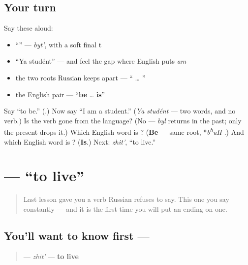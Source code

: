 \subsection*{Your turn}
Say these aloud:

\begin{itemize}
\raggedright
  \item \textquotedblleft{}\textquotedblright{} — \emph{byt'}, with a soft final t
  \item \textquotedblleft{}Ya studént\textquotedblright{} — and feel the gap where English puts \emph{am}
  \item the two roots Russian keeps apart — \textquotedblleft{} … \textquotedblright{}
  \item the English pair — \textquotedblleft{}\textbf{be} … \textbf{is}\textquotedblright{}
\end{itemize}

\begin{tcolorbox}[breakable,colback=teal!4,colframe=teal!35!black,title={Before you move on}]
Say \textquotedblleft{}to be.\textquotedblright{} (\textbf{}.) Now say \textquotedblleft{}I am a student.\textquotedblright{} (\emph{Ya studént} — two words, and no verb.) Is the verb gone from the language? (No — \emph{byl} returns in the past; only the present drops it.) Which English word is \emph{}? (\textbf{Be} — same root, *\emph{b\textsuperscript{h}uH-}.) And which English word is \emph{}? (\textbf{Is}.) Next: \emph{zhit'}, \textquotedblleft{}to live.\textquotedblright{}
\end{tcolorbox}
\section[\texorpdfstring{\ru{жить} (zhit')}{жить (zhit')}]{ — \textquotedblleft{}to live\textquotedblright{}}

\label{lesson:RU-C03-zhit}



\begin{quote}
Last lesson gave you a verb Russian refuses to say. This one you say constantly — and it is the first time you will put an ending on one.
\end{quote}

\subsection*{You'll want to know first — }
\begin{quote}
\textbf{} — \emph{zhit'} — \textbf{to live}
\end{quote}

